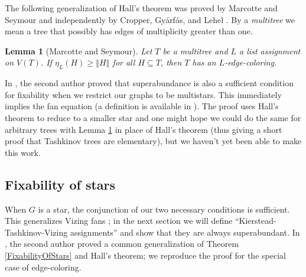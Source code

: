 \documentclass[12pt]{article}
\theoremstyle{plain}
\newtheorem{lem}[thm]{Lemma}
\theoremstyle{definition}
\theoremstyle{remark}
\newcommand{\size}[1]{\left\Vert#1\right\Vert}
\begin{document}
The following generalization of Hall's theorem was proved by Marcotte and
Seymour \cite{marcotte1990extending} and independently by Cropper,
Gy{\'a}rf{\'a}s, and Lehel \cite{cropper2003edge}.  By a \emph{multitree} we
mean a tree that possibly has edges of multiplicity greater than one.

\begin{lem}[Marcotte and Seymour]\label{MultiTreeHall}
Let $T$ be a multitree and $L$ a list assignment on $V(T)$.  If $\eta_L(H) \ge \size{H}$ for all $H \subseteq T$, then $T$ has an $L$-edge-coloring.
\end{lem}

In \cite{HallGame}, the second author proved that superabundance is also a
sufficient condition for fixability when we restrict our graphs to be
multistars.  This immediately implies the fan equation (a definition is
available in \cite[p. 19ff]{stiebitz2012book}).  The proof uses Hall's theorem
to reduce to a smaller star and one might hope we could do the same for
arbitrary trees with Lemma \ref{MultiTreeHall} in place of Hall's theorem (thus
giving a short proof that Tashkinov trees are elementary), but we haven't yet
been able to make this work.

\subsection{Fixability of stars}
When $G$ is a star, the conjunction of our two necessary conditions is sufficient. This generalizes Vizing fans \cite{Vizing76}; in the next section we will define ``Kierstead-Tashkinov-Vizing assignments'' and show that they are always superabundant.  In \cite{HallGame}, the second author proved a common generalization of Theorem \ref{FixabilityOfStars} and Hall's theorem; we reproduce the proof for the special case of edge-coloring.
\end{document}
